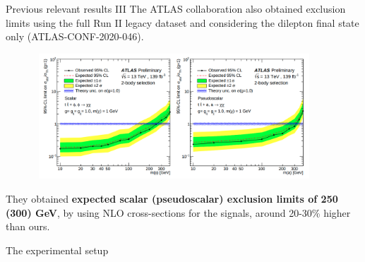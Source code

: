 \documentclass[8pt]{beamer}
\begin{document}
\begin{frame}{Previous relevant results III}
\justifying
The \alert{ATLAS collaboration also obtained exclusion limits} using the full Run II legacy dataset and considering the dilepton final state only (ATLAS-CONF-2020-046). \vfill

 \begin{figure}[htbp]
\centering
\includegraphics[width=10.5cm, height=4.7cm]{figs/ATLASICHEP.png}
\end{figure} \vfill

They obtained \textbf{expected scalar (pseudoscalar) exclusion limits of 250 (300) GeV}, by using NLO cross-sections for the signals, around 20-30\% higher than ours. \vfill
\end{frame}


















\begin{frame}[standout]
The experimental setup
\end{frame}
\end{document}
